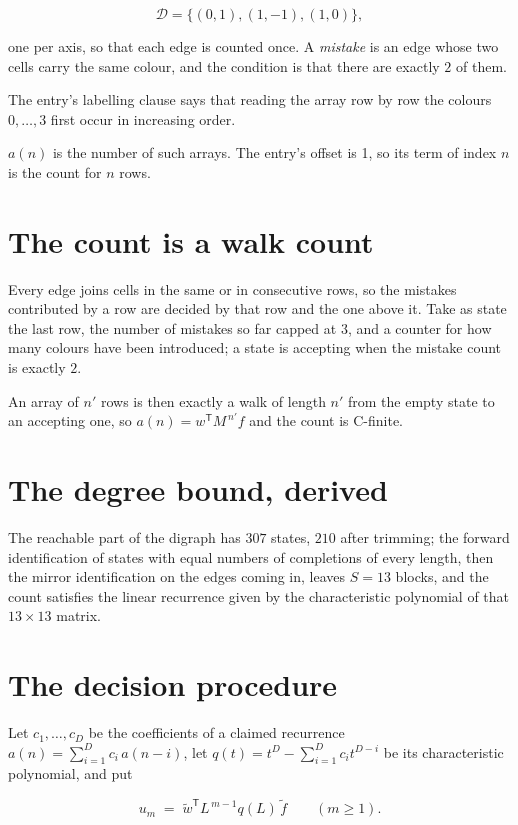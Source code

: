 \documentclass[11pt]{article}
\theoremstyle{definition}
\begin{document}
\[\mathcal{D} = \{(0,1), (1,-1), (1,0)\},\]

one per axis, so that each edge is counted once. A {\itshape mistake} is an edge whose two cells carry the same colour, and the condition is that there are exactly $2$ of them.

The entry's labelling clause says that reading the array row by row the colours $0,\dots,3$ first occur in increasing order.

$a(n)$ is the number of such arrays. The entry's offset is 1, so its term of index $n$ is the count for $n$ rows.

\section{The count is a walk count}

Every edge joins cells in the same or in consecutive rows, so the mistakes contributed by a row are decided by that row and the one above it. Take as state the last row, the number of mistakes so far capped at $3$, and a counter for how many colours have been introduced; a state is accepting when the mistake count is exactly $2$.

An array of $n'$ rows is then exactly a walk of length $n'$ from the empty state to an accepting one, so $a(n) = w^{\mathsf T}M^{\,n'}f$ and the count is C-finite.

\section{The degree bound, derived}

The reachable part of the digraph has $307$ states, $210$ after trimming; the forward identification of states with equal numbers of completions of every length, then the mirror identification on the edges coming in, leaves $S = 13$ blocks, and the count satisfies the linear recurrence given by the characteristic polynomial of that $13\times13$ matrix.

\section{The decision procedure}

Let $c_1,\dots,c_D$ be the coefficients of a claimed recurrence $a(n) = \sum_{i=1}^{D} c_i\,a(n-i)$, let $q(t) = t^{D} - \sum_{i=1}^{D} c_i t^{D-i}$ be its characteristic polynomial, and put

\[u_m \;=\; \tilde w^{\mathsf T} L^{\,m-1} q(L)\,\tilde f \qquad (m \ge 1).\]
\end{document}
